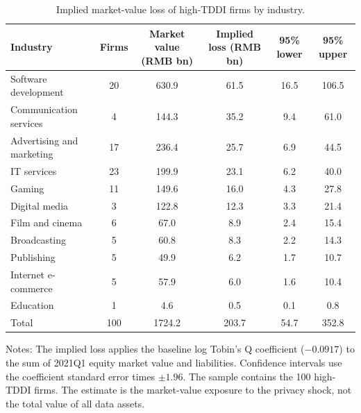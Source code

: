 \begin{table}[htbp]
\centering
\small
\small
\setlength{\tabcolsep}{3pt}
\caption{Implied market-value loss of high-TDDI firms by industry.}
\label{tab:value}
\begin{threeparttable}
\begin{tabular}{lccccc}
\toprule
Industry & Firms & Market value (RMB bn) & Implied loss (RMB bn) & 95\% lower & 95\% upper \\
\midrule
Software development & 20 & 630.9 & 61.5 & 16.5 & 106.5 \\
Communication services & 4 & 144.3 & 35.2 & 9.4 & 61.0 \\
Advertising and marketing & 17 & 236.4 & 25.7 & 6.9 & 44.5 \\
IT services & 23 & 199.9 & 23.1 & 6.2 & 40.0 \\
Gaming & 11 & 149.6 & 16.0 & 4.3 & 27.8 \\
Digital media & 3 & 122.8 & 12.3 & 3.3 & 21.4 \\
Film and cinema & 6 & 67.0 & 8.9 & 2.4 & 15.4 \\
Broadcasting & 5 & 60.8 & 8.3 & 2.2 & 14.3 \\
Publishing & 5 & 49.9 & 6.2 & 1.7 & 10.7 \\
Internet e-commerce & 5 & 57.9 & 6.0 & 1.6 & 10.4 \\
Education & 1 & 4.6 & 0.5 & 0.1 & 0.8 \\
\midrule
Total & 100 & 1724.2 & 203.7 & 54.7 & 352.8 \\
\bottomrule
\end{tabular}
\begin{tablenotes}[flushleft]
\footnotesize
\item Notes: The implied loss applies the baseline log Tobin's Q coefficient ($-0.0917$) to the sum of 2021Q1 equity market value and liabilities. Confidence intervals use the coefficient standard error times $\pm1.96$. The sample contains the 100 high-TDDI firms. The estimate is the market-value exposure to the privacy shock, not the total value of all data assets.
\end{tablenotes}
\end{threeparttable}
\end{table}
